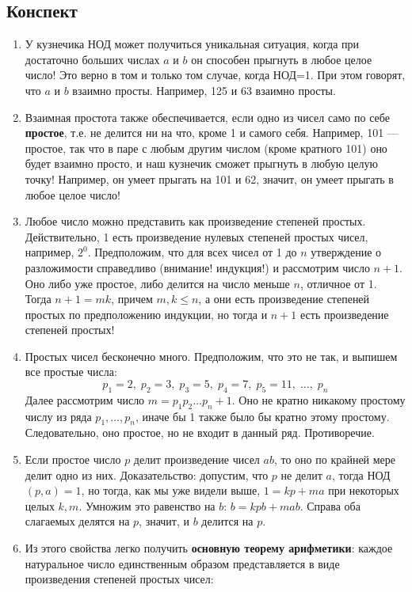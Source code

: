 \subsection{Конспект}
\begin{enumerate}\setlength{\itemsep}{1pt}
\item У кузнечика НОД может получиться уникальная ситуация, когда при достаточно больших числах $a$ и $b$ он способен прыгнуть в любое целое число! Это верно в том и только том случае, когда НОД=1. При этом говорят, что $a$ и $b$ взаимно просты. Например, 125 и 63 взаимно просты.
\item Взаимная простота также обеспечивается, если одно из чисел само по себе \textbf{простое}, т.е. не делится ни на что, кроме 1 и самого себя. Например, 101 --- простое, так что в паре с любым другим числом (кроме кратного 101) оно будет взаимно просто, и наш кузнечик сможет прыгнуть в любую целую точку! Например, он умеет прыгать на 101 и 62, значит, он умеет прыгать в любое целое число!
\item Любое число можно представить как произведение степеней простых. Действительно, 1 есть произведение нулевых степеней простых чисел, например, $2^0$. Предположим, что для всех чисел от 1 до $n$ утверждение о разложимости справедливо (внимание! индукция!) и рассмотрим число $n+1$. Оно либо уже простое, либо делится на число меньше $n$, отличное от 1. Тогда $n+1=mk$, причем $m,k\le n$, а они есть произведение степеней простых по предположению индукции, но тогда и $n+1$ есть произведение степеней простых!
\item Простых чисел бесконечно много. Предположим, что это не так, и выпишем все простые числа:
$$
p_1=2,\;p_2=3,\;p_3=5,\;p_4=7,\;p_5=11,\;\dots,\;p_n
$$
Далее рассмотрим число $m=p_1p_2\dots p_n+1$. Оно не кратно никакому простому числу из ряда $p_1,\dots,p_n$, иначе бы 1 также было бы кратно этому простому. Следовательно, оно простое, но не входит в данный ряд. Противоречие.
\item Если простое число $p$ делит произведение чисел $ab$, то оно по крайней мере делит одно из них. Доказательство: допустим, что $p$ не делит $a$, тогда НОД$(p,a)=1$, но тогда, как мы уже видели выше, $1=kp+ma$ при некоторых целых $k,m$. Умножим это равенство на $b$: $b=kpb+mab$. Справа оба слагаемых делятся на $p$, значит, и $b$ делится на $p$.
\item Из этого свойства легко получить \textbf{основную теорему арифметики}: каждое натуральное число единственным образом представляется в виде произведения степеней простых чисел:

\end{enumerate}
